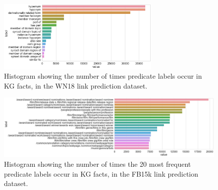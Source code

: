 
\begin{figure}
   	\centering
    	\includegraphics[width=0.7\textwidth, height=0.3\textheight]{WN18_Predicate_Counts}
	\captionsetup{justification=centering}
	\caption{Histogram showing the number of times predicate labels occur in KG facts, in the WN18 link prediction dataset.}
\end{figure}

\begin{figure}
   	\centering
    	\includegraphics[width=1.0\textwidth, height=0.3\textheight]{FB15k_Predicate_Counts}
	\captionsetup{justification=centering}
	\caption{Histogram showing the number of times the 20 most frequent predicate labels occur in KG facts, in the FB15k link prediction dataset.}
\end{figure}



